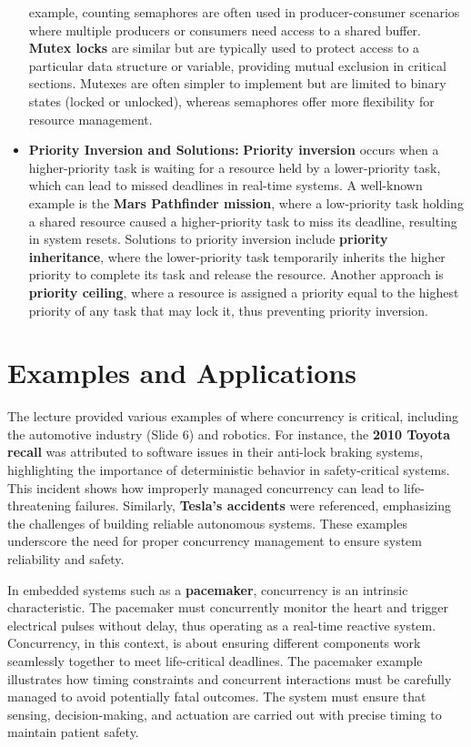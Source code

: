 \documentclass[
  14pt,
  a4paper,
  DIV=11,
  numbers=noendperiod,
  headinclude=true,
  footinclude=true]{scrreprt}
\begin{document}
\begin{itemize}
  example, counting semaphores are often used in producer-consumer
  scenarios where multiple producers or consumers need access to a
  shared buffer. \textbf{Mutex locks} are similar but are typically used
  to protect access to a particular data structure or variable,
  providing mutual exclusion in critical sections. Mutexes are often
  simpler to implement but are limited to binary states (locked or
  unlocked), whereas semaphores offer more flexibility for resource
  management.
\item
  \textbf{Priority Inversion and Solutions:} \textbf{Priority inversion}
  occurs when a higher-priority task is waiting for a resource held by a
  lower-priority task, which can lead to missed deadlines in real-time
  systems. A well-known example is the \textbf{Mars Pathfinder mission},
  where a low-priority task holding a shared resource caused a
  higher-priority task to miss its deadline, resulting in system resets.
  Solutions to priority inversion include \textbf{priority inheritance},
  where the lower-priority task temporarily inherits the higher priority
  to complete its task and release the resource. Another approach is
  \textbf{priority ceiling}, where a resource is assigned a priority
  equal to the highest priority of any task that may lock it, thus
  preventing priority inversion.
\end{itemize}

\section{Examples and Applications}\label{examples-and-applications}

The lecture provided various examples of where concurrency is critical,
including the automotive industry (Slide 6) and robotics. For instance,
the \textbf{2010 Toyota recall} was attributed to software issues in
their anti-lock braking systems, highlighting the importance of
deterministic behavior in safety-critical systems. This incident shows
how improperly managed concurrency can lead to life-threatening
failures. Similarly, \textbf{Tesla's accidents} were referenced,
emphasizing the challenges of building reliable autonomous systems.
These examples underscore the need for proper concurrency management to
ensure system reliability and safety.

In embedded systems such as a \textbf{pacemaker}, concurrency is an
intrinsic characteristic. The pacemaker must concurrently monitor the
heart and trigger electrical pulses without delay, thus operating as a
real-time reactive system. Concurrency, in this context, is about
ensuring different components work seamlessly together to meet
life-critical deadlines. The pacemaker example illustrates how timing
constraints and concurrent interactions must be carefully managed to
avoid potentially fatal outcomes. The system must ensure that sensing,
decision-making, and actuation are carried out with precise timing to
maintain patient safety.
\end{document}
